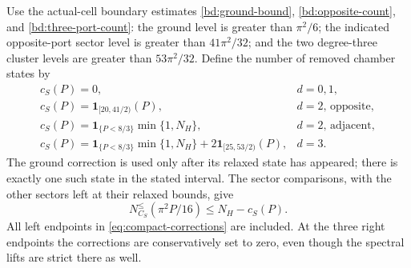 \documentclass[11pt,reqno]{amsart}
\numberwithin{equation}{section}
\begin{document}
Use the actual-cell boundary estimates
\eqref{bd:ground-bound}, \eqref{bd:opposite-count}, and
\eqref{bd:three-port-count}: the ground level is greater than $\pi^2/6$;
the indicated opposite-port sector level is greater than $41\pi^2/32$;
and the two degree-three cluster levels are greater than $53\pi^2/32$.
Define the number of removed chamber states by
\begin{equation}
 \begin{array}{ll}
 c_S(P)=0, & d=0,1,\\[2pt]
 c_S(P)=\mathbf1_{[20,41/2)}(P), & d=2\text{, opposite},\\[2pt]
 c_S(P)=\mathbf1_{\{P<8/3\}}\min\{1,N_H\},
       &d=2\text{, adjacent},\\[2pt]
 c_S(P)=\mathbf1_{\{P<8/3\}}\min\{1,N_H\}
          +2\mathbf1_{[25,53/2)}(P), &d=3.
 \end{array}
 \label{eq:compact-corrections}
\end{equation}
The ground correction is used only
after its relaxed state has appeared; there is exactly one such state
in the stated interval. The sector comparisons, with the other sectors
left at their relaxed bounds, give
\[
 N_{C_S}^{\le}(\pi^2P/16)\le N_H-c_S(P).
\]
All left endpoints in \eqref{eq:compact-corrections} are included.
At the three right endpoints the corrections are conservatively set to
zero, even though the spectral lifts are strict there as well.
\end{document}
